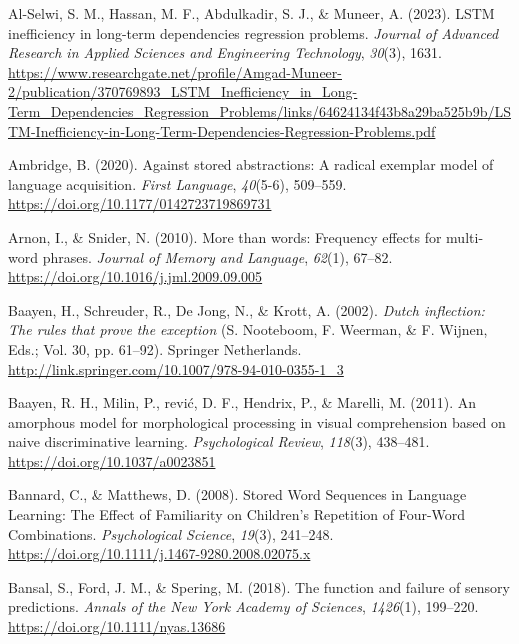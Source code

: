 \documentclass[
  12pt,
  letterpaper,
]{scrreport}
\newlength{\cslhangindent}
\newenvironment{CSLReferences}[2] %
 {\begin{list}{}{%
  \setlength{\itemindent}{0pt}
  \setlength{\leftmargin}{0pt}
  \setlength{\parsep}{0pt}
  \ifodd #1
   \setlength{\leftmargin}{\cslhangindent}
   \setlength{\itemindent}{-1\cslhangindent}
  \fi
  \setlength{\itemsep}{#2\baselineskip}}}
 {\end{list}}
\begin{document}
\label{refs}
\begin{CSLReferences}{1}{0}
Al-Selwi, S. M., Hassan, M. F., Abdulkadir, S. J., \& Muneer, A. (2023).
LSTM inefficiency in long-term dependencies regression problems.
\emph{Journal of Advanced Research in Applied Sciences and Engineering
Technology}, \emph{30}(3), 1631.
\url{https://www.researchgate.net/profile/Amgad-Muneer-2/publication/370769893_LSTM_Inefficiency_in_Long-Term_Dependencies_Regression_Problems/links/64624134f43b8a29ba525b9b/LSTM-Inefficiency-in-Long-Term-Dependencies-Regression-Problems.pdf}

Ambridge, B. (2020). Against stored abstractions: A radical exemplar
model of language acquisition. \emph{First Language}, \emph{40}(5-6),
509--559. \url{https://doi.org/10.1177/0142723719869731}

Arnon, I., \& Snider, N. (2010). More than words: Frequency effects for
multi-word phrases. \emph{Journal of Memory and Language}, \emph{62}(1),
67--82. \url{https://doi.org/10.1016/j.jml.2009.09.005}

Baayen, H., Schreuder, R., De Jong, N., \& Krott, A. (2002). \emph{Dutch
inflection: The rules that prove the exception} (S. Nooteboom, F.
Weerman, \& F. Wijnen, Eds.; Vol. 30, pp. 61--92). Springer Netherlands.
\url{http://link.springer.com/10.1007/978-94-010-0355-1_3}

Baayen, R. H., Milin, P., rević, D. F., Hendrix, P., \& Marelli, M.
(2011). An amorphous model for morphological processing in visual
comprehension based on naive discriminative learning.
\emph{Psychological Review}, \emph{118}(3), 438--481.
\url{https://doi.org/10.1037/a0023851}

Bannard, C., \& Matthews, D. (2008). Stored Word Sequences in Language
Learning: The Effect of Familiarity on Children's Repetition of
Four-Word Combinations. \emph{Psychological Science}, \emph{19}(3),
241--248. \url{https://doi.org/10.1111/j.1467-9280.2008.02075.x}

Bansal, S., Ford, J. M., \& Spering, M. (2018). The function and failure
of sensory predictions. \emph{Annals of the New York Academy of
Sciences}, \emph{1426}(1), 199--220.
\url{https://doi.org/10.1111/nyas.13686}


\end{CSLReferences}
\end{document}
